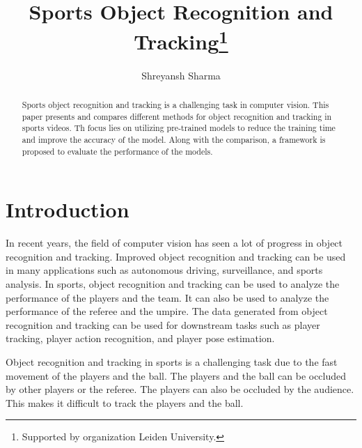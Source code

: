 \documentclass[runningheads]{llncs}
\begin{document}
%
\title{Sports Object Recognition and Tracking\thanks{Supported by organization Leiden University.}}
%
%
\author{Shreyansh Sharma }
%
%
%
\maketitle              %
%
\begin{abstract}
% 
Sports object recognition and tracking is a challenging task in computer vision. 
This paper presents and compares different methods for object recognition and tracking in sports videos.
Th focus lies on utilizing pre-trained models to reduce the training time and improve the accuracy of the model.
Along with the comparison, a framework is proposed to evaluate the performance of the models.

\end{abstract}
%
%
%
\section{Introduction}
In recent years, the field of computer vision has seen a lot of progress in object recognition and tracking.
Improved object recognition and tracking can be used in many applications such as autonomous driving, surveillance, and sports analysis.
In sports, object recognition and tracking can be used to analyze the performance of the players and the team.
It can also be used to analyze the performance of the referee and the umpire.
The data generated from object recognition and tracking can be used for downstream tasks such as player tracking, player action recognition, and player pose estimation.

Object recognition and tracking in sports is a challenging task due to the fast movement of the players and the ball.
The players and the ball can be occluded by other players or the referee.
The players can also be occluded by the audience.
This makes it difficult to track the players and the ball.
\end{document}
